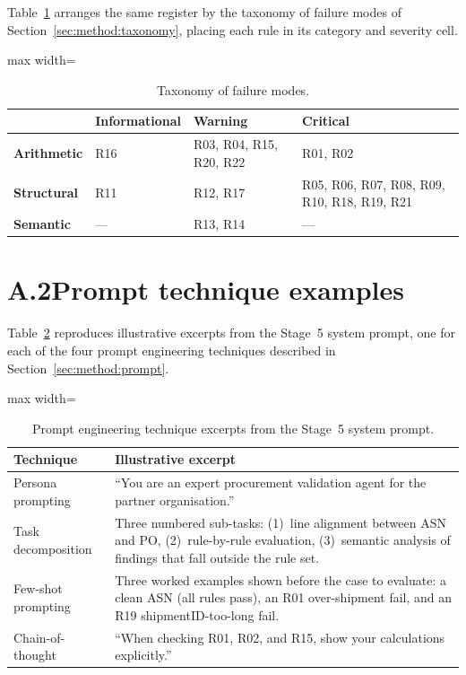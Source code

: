 Table~\ref{tab:method:taxonomy} arranges the same register by the taxonomy of failure modes of Section~\ref{sec:method:taxonomy}, placing each rule in its category and severity cell.

\begin{table}[htbp]
\centering
\caption{Taxonomy of failure modes.}
\label{tab:method:taxonomy}
\footnotesize
\begin{adjustbox}{max width=\textwidth}
\begin{tabular}{@{}lp{2.2cm}p{4.2cm}p{5.8cm}@{}}
\toprule
                    & \textbf{Informational} & \textbf{Warning}              & \textbf{Critical} \\
\midrule
\textbf{Arithmetic} & R16                   & R03, R04, R15, R20, R22       & R01, R02           \\
\textbf{Structural} & R11                   & R12, R17                      & R05, R06, R07, R08, R09, R10, R18, R19, R21 \\
\textbf{Semantic}   & ---                   & R13, R14                      & ---                \\
\bottomrule
\end{tabular}
\end{adjustbox}
\end{table}


\section*{A.2\quad Prompt technique examples} \label{app:prompt}

Table~\ref{tab:app:prompt} reproduces illustrative excerpts from the Stage~5 system prompt, one for each of the four prompt engineering techniques described in Section~\ref{sec:method:prompt}.

\begin{table}[htbp]
\centering
\caption{Prompt engineering technique excerpts from the Stage~5 system prompt.}
\label{tab:app:prompt}
\footnotesize
\begin{adjustbox}{max width=\textwidth}
\begin{tabular}{@{}p{3.2cm}p{9.5cm}@{}}
\toprule
\textbf{Technique} & \textbf{Illustrative excerpt} \\
\midrule
Persona prompting      & ``You are an expert procurement validation agent for the partner organisation.'' \\[6pt]
Task decomposition     & Three numbered sub-tasks: (1)~line alignment between ASN and PO, (2)~rule-by-rule evaluation, (3)~semantic analysis of findings that fall outside the rule set. \\[6pt]
Few-shot prompting     & Three worked examples shown before the case to evaluate: a clean ASN (all rules pass), an R01 over-shipment fail, and an R19 shipmentID-too-long fail. \\[6pt]
Chain-of-thought       & ``When checking R01, R02, and R15, show your calculations explicitly.'' \\
\bottomrule
\end{tabular}
\end{adjustbox}
\end{table}


